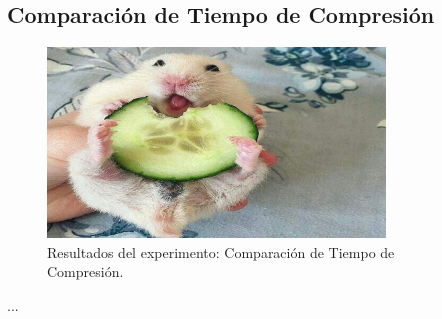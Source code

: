 \subsection{Comparación de Tiempo de Compresión}
\label{exp:compression-time}

\begin{figure}[H]
    \centering
    \includegraphics[width=0.8\textwidth]{testing/images/compression_time.png}
    \caption{Resultados del experimento: Comparación de Tiempo de Compresión.}
    \label{fig:compression-time}
\end{figure}

...
